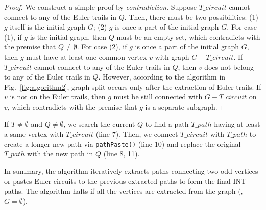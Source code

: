\begin{proof}
We construct a simple proof by \emph{contradiction}. Suppose $T\_circuit$ cannot connect to any of the Euler trails in $Q$. Then, there must be two possibilities: (1) $g$ itself is the initial graph $G$; (2) $g$ is once a part of the initial graph $G$. For case (1), if $g$ is the initial graph, then $Q$ must be an empty set, which contradicts with the premise that $Q \neq \emptyset$. For case (2), if $g$ is once a part of the initial graph $G$, then $g$ must have at least one common vertex $v$ with graph $G - T\_circuit$. If $T\_circuit$ cannot connect to any of the Euler trails in $Q$, then $v$ does not belong to any of the Euler trails in $Q$. However, according to the algorithm in Fig.~\ref{fig:algorithm2}, graph split occurs only after the extraction of Euler trails. If $v$ is not on the Euler trails, then $g$ must be still connected with $G - T\_circuit$ on $v$, which contradicts with the premise that $g$ is a separate subgraph.
\end{proof}



If $T \neq \emptyset$ and $Q \neq \emptyset$, we search the current $Q$ to find a path $T\_path$ having at least a same vertex with $T\_circuit$ (line 7). Then, we connect $T\_circuit$ with $T\_path$ to create a longer new path via \texttt{pathPaste()} (line 10) and replace the original $T\_path$ with the new path in $Q$ (line 8, 11).

In summary, the algorithm iteratively extracts paths connecting two odd vertices or pastes Euler circuits to the previous extracted paths to form the final INT paths. The algorithm halts if all the vertices are extracted from the graph (\ie, $G = \emptyset$).





